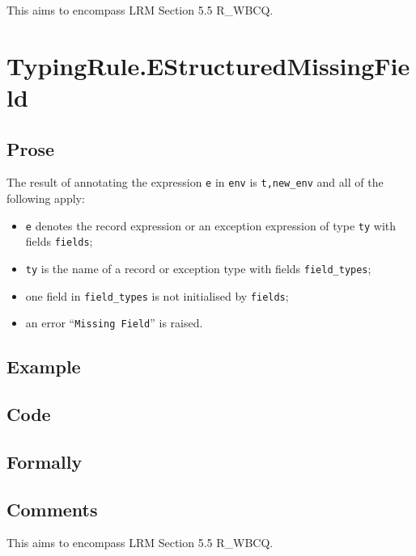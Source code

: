 \documentclass{book}
\begin{document}
  This aims to encompass LRM Section 5.5 R\_WBCQ.

\section{TypingRule.EStructuredMissingField \label{sec:TypingRule.EStructuredMissingField}}

  \subsection{Prose}
  The result of annotating the expression \texttt{e} in \texttt{env} is
\texttt{t,new\_env} and all of the following apply:
  \begin{itemize}
  \item \texttt{e} denotes the record expression or an exception expression of type \texttt{ty} with fields \texttt{fields};
  \item \texttt{ty} is the name of a record or exception type with fields \texttt{field\_types};
  \item one field in \texttt{field\_types} is not initialised by \texttt{fields};
  \item an error ``\texttt{Missing Field}'' is raised.
  \end{itemize}

  \subsection{Example}

  \subsection{Code}

\begin{emptyformal}
    \subsection{Formally}
\end{emptyformal}

\subsection{Comments}
  This aims to encompass LRM Section 5.5 R\_WBCQ.
\end{document}
